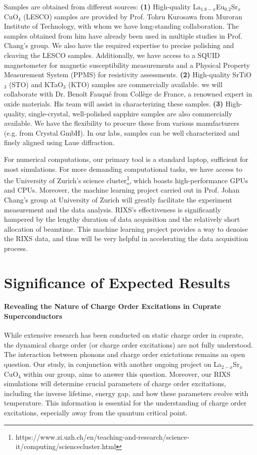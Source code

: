 \documentclass[11pt]{article}
\begin{document}
Samples are obtained from different sources: \textbf{(1)} High-quality {La$_{1.8-x}$Eu$_{0.2}$Sr$_x$CuO$_{4}$} (LESCO) samples are provided by Prof. Tohru Kurosawa from Muroran Institute of Technology, with whom we have long-standing collaboration. The samples obtained from him have already been used in multiple studies\cite{choi2022unveiling,wang_charge_2021} in Prof. Chang's group.
We also have the required expertise to precise polishing and cleaving the LESCO samples. Additionally, we have access to a SQUID magnetometer for magnetic susceptibility measurements and a Physical Property Measurement System (PPMS) for resistivity assessments.
\textbf{(2)} High-quality SrTiO$_{3}$ (STO) and KTaO$_{3}$ (KTO) samples are commercially available. we will collaborate with Dr. Benoît Fauqué from Collège de France, a renowned expert in oxide materials. His team will assist in characterizing these samples.
\textbf{(3)} High-quality, single-crystal, well-polished sapphire samples are also commercially available. We have the flexibility to procure these from various manufacturers (e.g. from Crystal GmbH).
In our labs, samples can be well characterized and finely aligned using Laue diffraction.

For numerical computations, our primary tool is a standard laptop, sufficient for most simulations. For more demanding computational tasks, we have access to the University of Zurich's science cluster\footnote{https://www.zi.uzh.ch/en/teaching-and-research/science-it/computing/sciencecluster.html}, which boasts high-performance GPUs and CPUs. Moreover, the machine learning project carried out in Prof. Johan Chang's group at University of Zurich will greatly facilitate the experiment measurement and the data analysis. RIXS's  effectiveness is significantly hampered by the lengthy duration of data acquisition and the relatively short allocation of beamtime. This machine learning project provides a way to denoise the RIXS data, and thus will be very helpful in accelerating the data acquisition process.  


\section{Significance of Expected Results}
\paragraph{Revealing the Nature of Charge Order Excitations in Cuprate Superconductors} While extensive research has been conducted on static charge order in cuprate, the dynamical charge order (or charge order excitations) are not fully understood. The interaction between phonons and charge order exictations remains an open question. Our study, in conjunction with another ongoing project on La$_{2-x}$Sr$_x$CuO$_4$ within our group, aims to answer this question. Moreover, our RIXS simulations will determine crucial parameters of charge order excitations, including the inverse lifetime, energy gap, and how these parameters evolve with temperature. This information is essential for the understanding of charge order excitations, especially away from the quantum critical point. 
\end{document}
